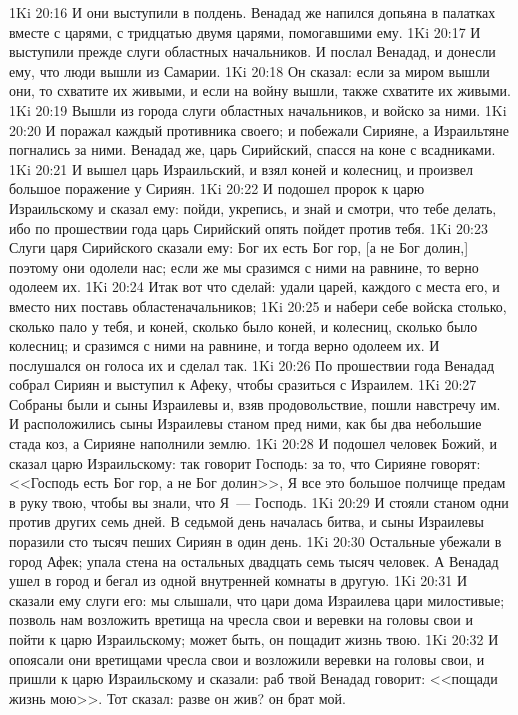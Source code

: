 \vs 1Ki 20:16 И они выступили в полдень. Венадад же напился допьяна в палатках вместе с царями, с тридцатью двумя царями, помогавшими ему.
\vs 1Ki 20:17 И выступили прежде слуги областных начальников. И послал Венадад, и донесли ему, что люди вышли из Самарии.
\vs 1Ki 20:18 Он сказал: если за миром вышли они, то схватите их живыми, и если на войну вышли, также схватите их живыми.
\vs 1Ki 20:19 Вышли из города слуги областных начальников, и войско за ними.
\vs 1Ki 20:20 И поражал каждый противника своего; и побежали Сирияне, а Израильтяне погнались за ними. Венадад же, царь Сирийский, спасся на коне с всадниками.
\vs 1Ki 20:21 И вышел царь Израильский, и взял коней и колесниц, и произвел большое поражение у Сириян.
\rsbpar\vs 1Ki 20:22 И подошел пророк к царю Израильскому и сказал ему: пойди, укрепись, и знай и смотри, что тебе делать, ибо по прошествии года царь Сирийский опять пойдет против тебя.
\vs 1Ki 20:23 Слуги царя Сирийского сказали ему: Бог их есть Бог гор, [а не Бог долин,] поэтому они одолели нас; если же мы сразимся с ними на равнине, то верно одолеем их.
\vs 1Ki 20:24 Итак вот что сделай: удали царей, каждого с места его, и вместо них поставь областеначальников;
\vs 1Ki 20:25 и набери себе войска столько, сколько пало у тебя, и коней, сколько было коней, и колесниц, сколько было колесниц; и сразимся с ними на равнине, и тогда верно одолеем их. И послушался он голоса их и сделал так.
\rsbpar\vs 1Ki 20:26 По прошествии года Венадад собрал Сириян и выступил к Афеку, чтобы сразиться с Израилем.
\vs 1Ki 20:27 Собраны были и сыны Израилевы и, взяв продовольствие, пошли навстречу им. И расположились сыны Израилевы станом пред ними, как бы два небольшие стада коз, а Сирияне наполнили землю.
\vs 1Ki 20:28 И подошел человек Божий, и сказал царю Израильскому: так говорит Господь: за то, что Сирияне говорят: <<Господь есть Бог гор, а не Бог долин>>, Я все это большое полчище предам в руку твою, чтобы вы знали, что Я~--- Господь.
\vs 1Ki 20:29 И стояли станом одни против других семь дней. В седьмой день началась битва, и сыны Израилевы поразили сто тысяч пеших Сириян в один день.
\vs 1Ki 20:30 Остальные убежали в город Афек;  упала стена на остальных двадцать семь тысяч человек. А Венадад ушел в город и бегал из одной внутренней комнаты в другую.
\vs 1Ki 20:31 И сказали ему слуги его: мы слышали, что цари дома Израилева цари милостивые; позволь нам возложить вретища на чресла свои и веревки на головы свои и пойти к царю Израильскому; может быть, он пощадит жизнь твою.
\vs 1Ki 20:32 И опоясали они вретищами чресла свои и возложили веревки на головы свои, и пришли к царю Израильскому и сказали: раб твой Венадад говорит: <<пощади жизнь мою>>. Тот сказал: разве он жив? он брат мой.
